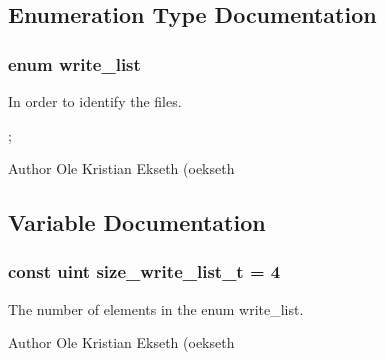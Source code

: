 \subsection{Enumeration Type Documentation}
\hypertarget{group__filter__container_ga325afe5f8676598d13bfaab40f8ce64e}{
\subsubsection[{write\_\-list}]{\setlength{\rightskip}{0pt plus 5cm}enum {\bf write\_\-list}}}
\label{group__filter__container_ga325afe5f8676598d13bfaab40f8ce64e}


In order to identify the files. 

; \begin{DoxyAuthor}{Author}
Ole Kristian Ekseth (oekseth 
\end{DoxyAuthor}


\subsection{Variable Documentation}
\hypertarget{group__filter__container_ga6b6d23698901cace6cbeaa20b999d9c0}{
\subsubsection[{size\_\-write\_\-list\_\-t}]{\setlength{\rightskip}{0pt plus 5cm}const uint {\bf size\_\-write\_\-list\_\-t} = 4}}
\label{group__filter__container_ga6b6d23698901cace6cbeaa20b999d9c0}


The number of elements in the enum write\_\-list. 

\begin{DoxyAuthor}{Author}
Ole Kristian Ekseth (oekseth 
\end{DoxyAuthor}
